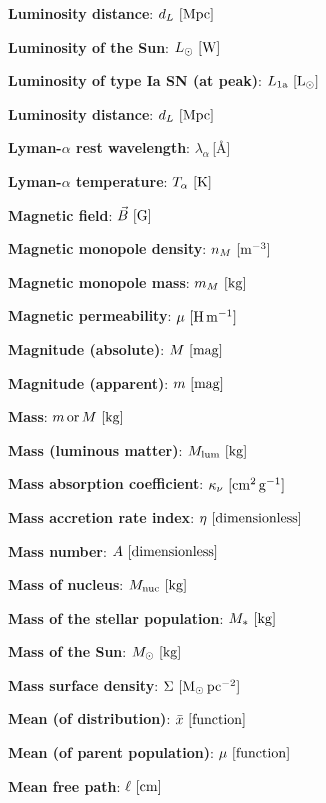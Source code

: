 \documentclass[a4paper,10pt]{article}
\begin{document}
{\noindent}\textbf{Luminosity distance}: $d_L ~ [{\rm Mpc}]$

{\noindent}\textbf{Luminosity of the Sun}: $L_\odot ~ [{\rm W}]$

{\noindent}\textbf{Luminosity of type Ia SN (at peak)}: $L_\mathrm{1a} ~ [{\rm L_\odot}]$

{\noindent}\textbf{Luminosity distance}: $d_L ~ [{\rm Mpc}]$

{\noindent}\textbf{Lyman-$\alpha$ rest wavelength}: $\lambda_\alpha$\,[\AA]

{\noindent}\textbf{Lyman-$\alpha$ temperature}: $T_\alpha ~ [{\rm K}]$

{\noindent}\textbf{Magnetic field}: $\vec{B} ~ [{\rm G}]$

{\noindent}\textbf{Magnetic monopole density}: $n_M ~ [{\rm m^{-3}}]$

{\noindent}\textbf{Magnetic monopole mass}: $m_M ~ [{\rm kg}]$

{\noindent}\textbf{Magnetic permeability}: $\mu ~ [{\rm H\,m^{-1}}]$

{\noindent}\textbf{Magnitude (absolute)}: $M ~ [{\rm mag}]$

{\noindent}\textbf{Magnitude (apparent)}: $m ~ [{\rm mag}]$

{\noindent}\textbf{Mass}: $m\,{\rm or}\,M ~ [{\rm kg}]$

{\noindent}\textbf{Mass (luminous matter)}: $M_{\rm lum} ~ [{\rm kg}]$

{\noindent}\textbf{Mass absorption coefficient}: $\kappa_\nu ~ [{\rm cm^2\,g^{-1}}]$

{\noindent}\textbf{Mass accretion rate index}: $\eta ~ [{\rm dimensionless}]$

{\noindent}\textbf{Mass number}: $A ~ [{\rm dimensionless}]$

{\noindent}\textbf{Mass of nucleus}: $M_{\rm nuc} ~ [{\rm kg}]$

{\noindent}\textbf{Mass of the stellar population}: $M_* ~ [{\rm kg}]$

{\noindent}\textbf{Mass of the Sun}: $M_\odot ~ [{\rm kg}]$

{\noindent}\textbf{Mass surface density}: $\Sigma ~ [{\rm M_\odot\,pc^{-2}}]$

{\noindent}\textbf{Mean (of distribution)}: $\bar{x} ~ [{\rm function}]$

{\noindent}\textbf{Mean (of parent population)}: $\mu ~ [{\rm function}]$

{\noindent}\textbf{Mean free path}: $\ell ~ [{\rm cm}]$
\end{document}

